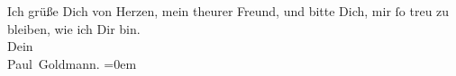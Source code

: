 \pstart
           Ich grüße Dich von Herzen, mein theurer Freund, und bitte Dich, mir{ }ſo treu zu
               bleiben, wie ich Dir bin. {\\[\baselineskip]}Dein {\\[\baselineskip]}\spacefill\mbox{Paul Goldmann.}\pend
           \leftskip=0em{}\endnumbering{}  \newcommand{\dateiname}{L02605}\newcommand{\titel}{Paul Goldmann an Arthur Schnitzler, 8. 1. [1894]}\newcommand{\editorInnen}{Martin Anton Müller und Laura Untner}
